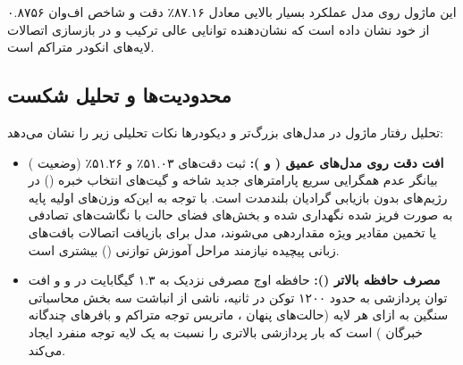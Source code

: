 این ماژول روی مدل  عملکرد بسیار بالایی معادل ۸۷.۱۶٪ دقت و شاخص اف‌وان ۰.۸۷۵۶ از خود نشان داده است که نشان‌دهنده توانایی عالی ترکیب  و  در بازسازی اتصالات لایه‌های انکودر متراکم است.

\subsection{محدودیت‌ها و تحلیل شکست}
تحلیل رفتار ماژول در مدل‌های بزرگ‌تر و دیکودرها نکات تحلیلی زیر را نشان می‌دهد:
\begin{itemize}
    \item \textbf{افت دقت روی مدل‌های عمیق ( و ):} ثبت دقت‌های ۵۱.۰۳٪ و ۵۱.۲۶٪ (وضعیت ) بیانگر عدم همگرایی سریع پارامترهای جدید شاخه  و گیت‌های انتخاب خبره () در رژیم‌های بدون بازیابی گرادیان بلندمدت است. با توجه به این‌که وزن‌های اولیه پایه به صورت فریز شده نگهداری شده و بخش‌های فضای حالت با نگاشت‌های تصادفی یا تخمین مقادیر ویژه مقداردهی می‌شوند، مدل برای بازیافت اتصالات بافت‌های زبانی پیچیده نیازمند مراحل آموزش توازنی () بیشتری است.
    \item \textbf{مصرف حافظه بالاتر ():} حافظه اوج مصرفی نزدیک به ۱.۳ گیگابایت در  و  و افت توان پردازشی به حدود ۱۲۰۰ توکن در ثانیه، ناشی از انباشت سه بخش محاسباتی سنگین به ازای هر لایه (حالت‌های پنهان ، ماتریس توجه متراکم و بافرهای چندگانه خبرگان ) است که بار پردازشی بالاتری را نسبت به یک لایه توجه منفرد ایجاد می‌کند.
\end{itemize}

